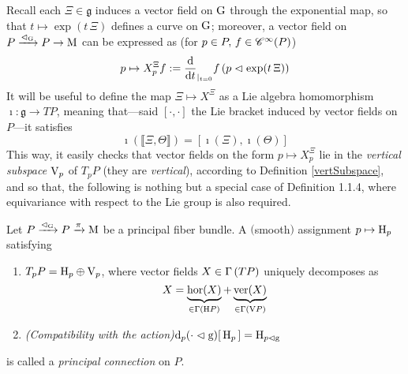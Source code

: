 Recall each $\Xi\in\mathfrak{g}$ induces a vector field on $\text{\normalfont G}$ through the exponential map, so that $t\mapsto\exp(t\,\Xi)$ defines a curve on $\text{\normalfont G}$; moreover, a vector field on $P\xrightarrow{\vartriangleleft_{\text{\normalfont G}}}P\to\text{\normalfont M}$ can be expressed as (for $p\in P,\,f\in\mathscr{C}^\infty(P)$)
$$p\mapsto X_p^\Xi f:={\frac{\text{\normalfont d}}{\text{\normalfont d} t}}_{|_{t=0}}f\left(p\vartriangleleft\exp(t\,\Xi)\right)$$
It will be useful to define the map $\Xi\mapsto X^\Xi$ as a Lie algebra homomorphism $\imath:\mathfrak{g}\to TP$, meaning that---said $[\cdot,\cdot]$ the Lie bracket induced by vector fields on $P$---it satisfies
$$\imath\left(\llbracket \Xi,\Theta\rrbracket\right)=[\imath(\Xi),\imath(\Theta)]$$
This way, it easily checks that vector fields on the form $p\mapsto X^\Xi_p$ lie in the \emph{vertical subspace} $\text{\normalfont V}_p$ of $T_pP$ (they are \emph{vertical}), according to Definition \ref{vertSubspace}, and so that, the following is nothing but a special case of Definition 1.1.4, where equivariance with respect to the Lie group is also required.


\begin{defi}
    Let $P\xrightarrow{\vartriangleleft_{\text{\normalfont G}}}P\xrightarrow{\pi}\text{\normalfont M}$ be a principal fiber bundle. A $($smooth$)$ assignment $p\mapsto\text{\normalfont H}_p$ satisfying
    \begin{enumerate}
        \item $T_pP=\text{\normalfont H}_p\oplus \text{\normalfont V}_p$, where vector fields $X\in\Gamma\left(TP\right)$ uniquely decomposes as
        $$X=\underbrace{\text{\normalfont hor}(X)}_{\in\Gamma\left(\text{\normalfont H} P\right)}+\underbrace{\text{\normalfont ver}(X)}_{\in\Gamma\left(\text{\normalfont V} P\right)}$$
        \item \emph{(Compatibility with the action)}\quad $\text{\normalfont d}_p(\cdot\vartriangleleft\text{\normalfont g})[\,\text{\normalfont H}_p\,]=\text{\normalfont H}_{p\vartriangleleft\text{\normalfont g}}$
    \end{enumerate}
    is called a \emph{principal connection} on $P$.
\end{defi}

